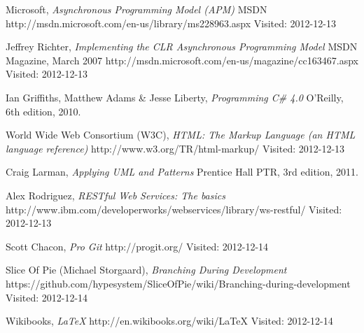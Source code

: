 \begin{thebibliography}{99}

		Microsoft,
		\emph{Asynchronous Programming Model (APM)}\newline
		MSDN\newline
		http://msdn.microsoft.com/en-us/library/ms228963.aspx\newline
		Visited: 2012-12-13
	
		Jeffrey Richter,
		\emph{Implementing the CLR Asynchronous Programming Model}\newline
		MSDN Magazine,
		March 2007\newline
		http://msdn.microsoft.com/en-us/magazine/cc163467.aspx\newline
		Visited: 2012-12-13

		Ian Griffiths, Matthew Adams \& Jesse Liberty,
		\emph{Programming C\# 4.0}\newline
		O'Reilly, 6th edition, 2010.

		World Wide Web Consortium (W3C),
		\emph{HTML: The Markup Language (an HTML language reference)}\newline
		http://www.w3.org/TR/html-markup/\newline
		Visited: 2012-12-13
        
        Craig Larman,
        \emph{Applying UML and Patterns}\newline
        Prentice Hall PTR, 3rd edition, 2011.
        
        Alex Rodriguez,
        \emph{RESTful Web Services: The basics}\newline
        http://www.ibm.com/developerworks/webservices/library/ws-restful/\newline
        Visited: 2012-12-13
        
        Scott Chacon,
        \emph{Pro Git}\newline
        http://progit.org/\newline
        Visited: 2012-12-14
        
        Slice Of Pie (Michael Storgaard),
        \emph{Branching During Development}\newline
        https://github.com/hypesystem/SliceOfPie/wiki/Branching-during-development\newline
        Visited: 2012-12-14
        
        Wikibooks,
        \emph{\LaTeX}\newline
        http://en.wikibooks.org/wiki/LaTeX\newline
        Visited: 2012-12-14
\end{thebibliography}